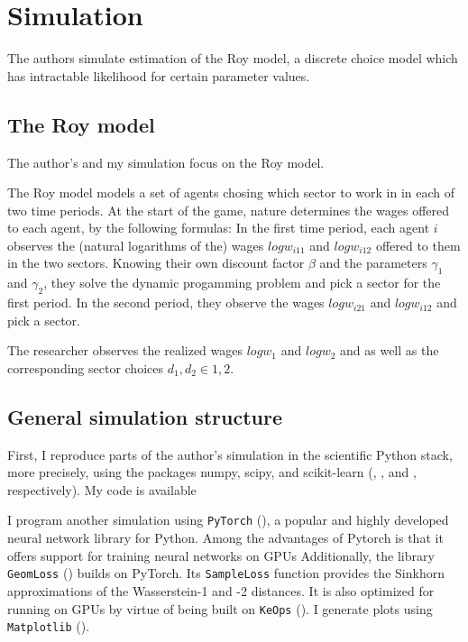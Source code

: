 \section{Simulation}
\label{sec:simulation}

The authors simulate estimation of the Roy model, a discrete choice model which has intractable likelihood for certain parameter values.

\subsection{The Roy model}
\label{sec:roy}

The author's and my simulation focus on the Roy model.

The Roy model models a set of agents chosing which sector to work in in each of two time periods.
At the start of the game, nature determines the wages offered to each agent, by the following formulas:
In the first time period, each agent $i$ observes the (natural logarithms of the) wages $log w_{i11}$ and $log w_{i12}$ offered to them in the two sectors.
Knowing their own discount factor $\beta$ and the parameters $\gamma_1$ and $\gamma_2$, they solve the dynamic progamming problem
and pick a sector for the first period.
In the second period, they observe the wages  $log w_{i21}$ and $log w_{i12}$ and pick a sector. %

The researcher observes the realized wages $log w_1$ and $log w_2$ and as well as the corresponding sector choices $d_1, d_2 \in {1, 2}$.

\subsection{General simulation structure}

First, I reproduce parts of the author's simulation in the scientific Python stack, more precisely, using the packages numpy, scipy, and scikit-learn (\textcite{harris2020array}, \textcite{2020SciPy-NMeth}, and \textcite{scikit-learn}, respectively).
My code is available %

I program another simulation using \texttt{PyTorch} (\cite{Ansel_PyTorch_2_Faster_2024}), a popular and highly developed neural network library for Python.
Among the advantages of Pytorch is that it offers support for training neural networks on GPUs %
Additionally, the library \texttt{GeomLoss} (\cite{feydy2019interpolating}) builds on PyTorch. 
Its \texttt{SampleLoss} function provides the Sinkhorn approximations of the Wasserstein-1 and -2 distances.
It is also optimized for running on GPUs by virtue of being built on \texttt{KeOps} (\cite{KeOps}).
I generate plots using \texttt{Matplotlib} (\cite{Matplotlib}).

